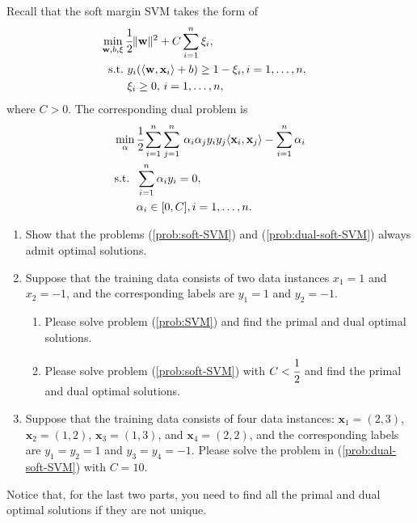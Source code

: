 \documentclass[11pt,letter,notitlepage]{article}
\begin{document}
\newpage
\begin{exercise}
	Recall that the soft margin SVM takes the form of
	\begin{align}\label{prob:soft-SVM}
		\min_{\mathbf{w},b,\xi}\, & \cfrac{1}{2}\|\mathbf{w}\|^2+C\sum_{i=1}^n\xi_i,                          \\ \nonumber
		{\rm s.t.\,}              & \,y_i(\langle\mathbf{w},\mathbf{x}_i\rangle+b)\geq1-\xi_i,i=1,\ldots,n, & \\ \nonumber
		                          & \,\xi_i\geq0,\,i=1,\ldots,n,
	\end{align}
	where $C>0$.
	The corresponding dual problem is
	\begin{align}\label{prob:dual-soft-SVM}
		\min_{\alpha}\, & \cfrac{1}{2}\sum_{i=1}^n\sum_{j=1}^n\,\alpha_i\alpha_jy_iy_j\langle\mathbf{x}_i,\mathbf{x}_j\rangle-\sum_{i=1}^n\alpha_i \\\nonumber
		\mbox{s.t. }\,  & \sum_{i=1}^n\alpha_iy_i=0,                                                                                               \\\nonumber
		                & \alpha_i\in[0,C],i=1,\ldots,n.
	\end{align}
	\begin{enumerate}
		\item Show that the problems (\ref{prob:soft-SVM}) and (\ref{prob:dual-soft-SVM}) always admit optimal solutions.

		\item Suppose that the training data consists of two data instances $x_1=1$ and $x_2=-1$, and the corresponding labels are $y_1=1$ and $y_2=-1$.
		      \begin{enumerate}
			      \item Please solve problem (\ref{prob:SVM}) and find the primal and dual optimal solutions.
			      \item Please solve problem (\ref{prob:soft-SVM}) with $C<\cfrac{1}{2}$ and find the primal and dual optimal solutions.
		      \end{enumerate}

		\item Suppose that the training data consists of four data instances: $\mathbf{x}_1=(2,3)$, $\mathbf{x}_2=(1,2)$, $\mathbf{x}_3=(1,3)$, and $\mathbf{x}_4=(2,2)$, and the corresponding labels are $y_1=y_2=1$ and $y_3=y_4=-1$. Please solve the problem in (\ref{prob:dual-soft-SVM}) with $C=10$.
	\end{enumerate}
	Notice that, for the last two parts, you need to find all the primal and dual optimal solutions if they are not unique.
\end{exercise}
\end{document}
